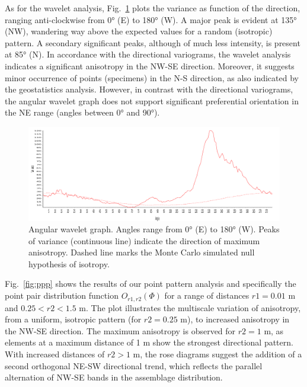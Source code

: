 \documentclass[review,times,authoryear]{elsarticle} %
\begin{document}

As for the wavelet analysis, Fig.~\ref{fig:wave} plots the variance as function of the direction, ranging anti-clockwise from 0° (E) to 180° (W). A major peak is evident at 135° (NW), wandering way above the expected values for a random (isotropic) pattern. A secondary significant peaks, although of much less intensity, is present at 85° (N). In accordance with the directional variograms, the wavelet analysis indicates a significant anisotropy in the NW-SE direction. Moreover, it suggests minor occurrence of points (specimens) in the N-S direction, as also indicated by the geostatistics analysis. However, in contrast with the directional variograms, the angular wavelet graph does not support significant preferential orientation in the NE range (angles between 0° and 90°). %

\begin{figure}
  \centering
  \includegraphics[width=1\textwidth]{./artwork/Fig:wave_.pdf}
  \caption{Angular wavelet graph. Angles range from 0° (E) to 180° (W). Peaks of variance (continuous line) indicate the direction of maximum anisotropy. Dashed line marks the Monte Carlo simulated null hypothesis of isotropy.}
  \label{fig:wave}
\end{figure}

Fig.~\ref{fig:ppp} shows the results of our point pattern analysis and specifically the point pair distribution function $O_{r1,r2}(\Phi)$ for a range of distances $r1=0.01$ m and $0.25<r2<1.5$ m. The plot illustrates the multiscale variation of anisotropy, from a uniform, isotropic pattern (for $r2=0.25$ m), to increased anisotropy in the NW-SE direction. The maximum anisotropy is observed for $r2=1$ m, as elements at a maximum distance of 1 m show the strongest directional pattern. With increased distances of $r2>1$ m, the rose diagrams suggest the addition of a second orthogonal NE-SW directional trend, which reflects the parallel alternation of NW-SE bands in the assemblage distribution.
\end{document}
